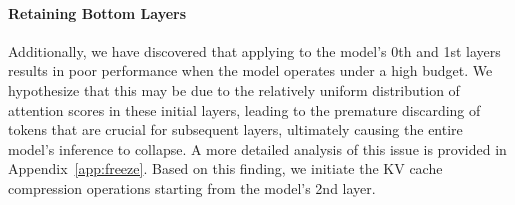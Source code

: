 \paragraph{Retaining Bottom Layers} Additionally, we have discovered that applying \method to the model's 0th and 1st layers results in poor performance when the model operates under a high budget. We hypothesize that this may be due to the relatively uniform distribution of attention scores in these initial layers, leading to the premature discarding of tokens that are crucial for subsequent layers, ultimately causing the entire model's inference to collapse. A more detailed analysis of this issue is provided in Appendix~\ref{app:freeze}. Based on this finding, we initiate the KV cache compression operations starting from the model's 2nd layer.
